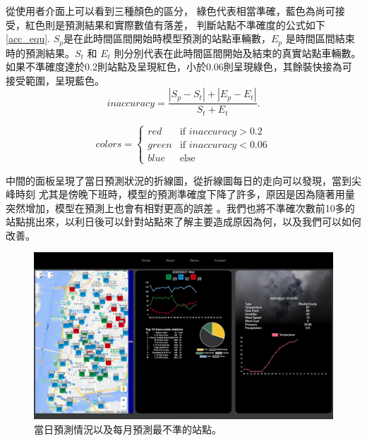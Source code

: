 \documentclass[a4paper,14pt]{extarticle}
\begin{document}
            從使用者介面上可以看到三種顏色的區分，
            綠色代表相當準確，藍色為尚可接受，紅色則是預測結果和實際數值有落差，
            判斷站點不準確度的公式如下 \ref{acc_equ}. $S_p$是在此時間區間開始時模型預測的站點車輛數，$E_p$ 
            是時間區間結束時的預測結果。$S_t$ 和 $E_t$ 則分別代表在此時間區間開始及結束的真實站點車輛數。
            如果不準確度達於0.2則站點及呈現紅色，小於0.06則呈現綠色，其餘裝快接為可接受範圍，呈現藍色。
            \begin{equation}
            \label{acc_equ}
            \text{$inaccuracy$} = \frac{|S_p-S_t|+|E_p-E_t|}{S_t+E_t}.
            \end{equation}

            \[
            colors =
            \begin{cases}
            red & \text{if $inaccuracy>0.2$} \\
            green & \text{if $inaccuracy<0.06$} \\
            blue & \text{else} 
            \end{cases}
            \]

             中間的面板呈現了當日預測狀況的折線圖，從折線圖每日的走向可以發現，當到尖峰時刻
            尤其是傍晚下班時，模型的預測準確度下降了許多，原因是因為隨著用量突然增加，模型在預測上也會有相對更高的誤差
            。我們也將不準確次數前10多的站點挑出來，以利日後可以針對站點來了解主要造成原因為何，以及我們可以如何改善。
            \begin{figure}[htbp]
                \centering
                \includegraphics[width=\textwidth]{details.png}
                \caption{
                    當日預測情況以及每月預測最不準的站點。
                }
                \label{fig:details}
            \end{figure}
\end{document}
